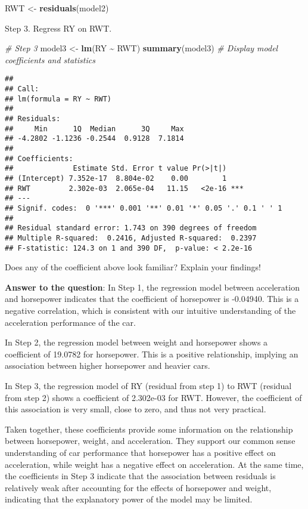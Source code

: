 \documentclass[
]{article}
\newenvironment{Shaded}{\begin{snugshade}}{\end{snugshade}}
\newcommand{\CommentTok}[1]{\textcolor[rgb]{0.56,0.35,0.01}{\textit{#1}}}
\newcommand{\FunctionTok}[1]{\textcolor[rgb]{0.13,0.29,0.53}{\textbf{#1}}}
\newcommand{\NormalTok}[1]{#1}
\newcommand{\OtherTok}[1]{\textcolor[rgb]{0.56,0.35,0.01}{#1}}
\newcommand{\SpecialCharTok}[1]{\textcolor[rgb]{0.81,0.36,0.00}{\textbf{#1}}}
\begin{document}
\begin{Shaded}
\begin{Highlighting}[]
\NormalTok{RWT }\OtherTok{\textless{}{-}} \FunctionTok{residuals}\NormalTok{(model2)}
\end{Highlighting}
\end{Shaded}

Step 3. Regress RY on RWT.

\begin{Shaded}
\begin{Highlighting}[]
\CommentTok{\# Step 3}
\NormalTok{model3 }\OtherTok{\textless{}{-}} \FunctionTok{lm}\NormalTok{(RY }\SpecialCharTok{\textasciitilde{}}\NormalTok{ RWT)}
\FunctionTok{summary}\NormalTok{(model3)  }\CommentTok{\# Display model coefficients and statistics}
\end{Highlighting}
\end{Shaded}

\begin{verbatim}
## 
## Call:
## lm(formula = RY ~ RWT)
## 
## Residuals:
##     Min      1Q  Median      3Q     Max 
## -4.2802 -1.1236 -0.2544  0.9128  7.1814 
## 
## Coefficients:
##              Estimate Std. Error t value Pr(>|t|)    
## (Intercept) 7.352e-17  8.804e-02    0.00        1    
## RWT         2.302e-03  2.065e-04   11.15   <2e-16 ***
## ---
## Signif. codes:  0 '***' 0.001 '**' 0.01 '*' 0.05 '.' 0.1 ' ' 1
## 
## Residual standard error: 1.743 on 390 degrees of freedom
## Multiple R-squared:  0.2416, Adjusted R-squared:  0.2397 
## F-statistic: 124.3 on 1 and 390 DF,  p-value: < 2.2e-16
\end{verbatim}

Does any of the coefficient above look familiar? Explain your findings!

\textbf{Answer to the question}: In Step 1, the regression model between
acceleration and horsepower indicates that the coefficient of horsepower
is -0.04940. This is a negative correlation, which is consistent with
our intuitive understanding of the acceleration performance of the car.

In Step 2, the regression model between weight and horsepower shows a
coefficient of 19.0782 for horsepower. This is a positive relationship,
implying an association between higher horsepower and heavier cars.

In Step 3, the regression model of RY (residual from step 1) to RWT
(residual from step 2) shows a coefficient of 2.302e-03 for RWT.
However, the coefficient of this association is very small, close to
zero, and thus not very practical.

Taken together, these coefficients provide some information on the
relationship between horsepower, weight, and acceleration. They support
our common sense understanding of car performance that horsepower has a
positive effect on acceleration, while weight has a negative effect on
acceleration. At the same time, the coefficients in Step 3 indicate that
the association between residuals is relatively weak after accounting
for the effects of horsepower and weight, indicating that the
explanatory power of the model may be limited.
\end{document}
